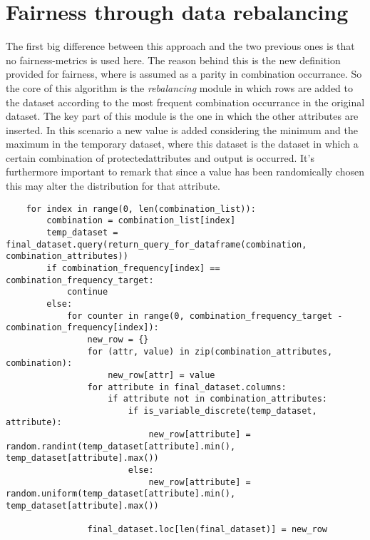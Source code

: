 \documentclass[12pt,a4paper,openright,twoside]{book}
\begin{document}
\section{Fairness through data rebalancing}
The first big difference between this approach and the two previous ones is that no fairness-metrics is used here. The reason behind this is the new definition provided for fairness, where is assumed as a parity in combination occurrance. So the core of this algorithm is the \emph{rebalancing} module in which rows are added to the dataset according to the most frequent combination occurrance in the original dataset.
The key part of this module is the one in which the other attributes are inserted. In this scenario a new value is added considering the minimum and the maximum in the temporary dataset, where this dataset is the dataset in which a certain combination of protected\textunderscore attributes and output is occurred. It's furthermore important to remark that since a value has been  randomically chosen this may alter the distribution for that attribute.
\begin{lstlisting}
    for index in range(0, len(combination_list)):
        combination = combination_list[index]
        temp_dataset = final_dataset.query(return_query_for_dataframe(combination, combination_attributes))
        if combination_frequency[index] == combination_frequency_target:
            continue
        else:
            for counter in range(0, combination_frequency_target - combination_frequency[index]):
                new_row = {}
                for (attr, value) in zip(combination_attributes, combination):
                    new_row[attr] = value
                for attribute in final_dataset.columns:
                    if attribute not in combination_attributes:
                        if is_variable_discrete(temp_dataset, attribute):
                            new_row[attribute] = random.randint(temp_dataset[attribute].min(), temp_dataset[attribute].max())
                        else:
                            new_row[attribute] = random.uniform(temp_dataset[attribute].min(), temp_dataset[attribute].max())
                
                final_dataset.loc[len(final_dataset)] = new_row

\end{lstlisting}

\end{document}
